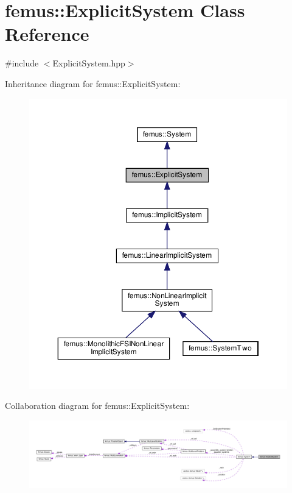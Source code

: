 \hypertarget{classfemus_1_1_explicit_system}{}\section{femus\+:\+:Explicit\+System Class Reference}
\label{classfemus_1_1_explicit_system}


{\ttfamily \#include $<$Explicit\+System.\+hpp$>$}



Inheritance diagram for femus\+:\+:Explicit\+System\+:
\nopagebreak
\begin{figure}[H]
\begin{center}
\leavevmode
\includegraphics[width=350pt]{classfemus_1_1_explicit_system__inherit__graph}
\end{center}
\end{figure}


Collaboration diagram for femus\+:\+:Explicit\+System\+:
\nopagebreak
\begin{figure}[H]
\begin{center}
\leavevmode
\includegraphics[width=350pt]{classfemus_1_1_explicit_system__coll__graph}
\end{center}
\end{figure}
